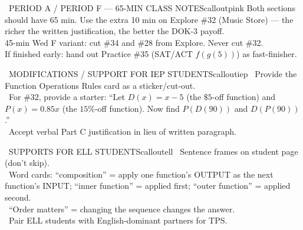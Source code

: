 \documentclass[11pt]{article}
\begin{document}
\clearpage

\begin{callout}{\IconClock\ PERIOD A / PERIOD F --- 65-MIN CLASS NOTES}{calloutpink}
Both sections should have 65 min. Use the extra 10 min on Explore \#32 (Music Store) --- the richer the written justification, the better the DOK-3 payoff.\\
45-min Wed F variant: cut \#34 and \#28 from Explore. Never cut \#32.\\
If finished early: hand out Practice \#35 (SAT/ACT \(f(g(5))\)) as fast-finisher.
\end{callout}

\begin{callout}{\IconPuzzle\ MODIFICATIONS / SUPPORT FOR IEP STUDENTS}{calloutiep}
\textbullet\ Provide the Function Operations Rules card as a sticker/cut-out.\\
\textbullet\ For \#32, provide a starter: ``Let \(D(x) = x - 5\) (the \(\$5\)-off function) and \(P(x) = 0.85x\) (the \(15\%\)-off function). Now find \(P(D(90))\) and \(D(P(90))\).''\\
\textbullet\ Accept verbal Part C justification in lieu of written paragraph.
\end{callout}

\begin{callout}{\IconGlobe\ SUPPORTS FOR ELL STUDENTS}{calloutell}
\textbullet\ Sentence frames on student page (don't skip).\\
\textbullet\ Word cards: ``composition'' = apply one function's OUTPUT as the next function's INPUT; ``inner function'' = applied first; ``outer function'' = applied second.\\
\textbullet\ ``Order matters'' = changing the sequence changes the answer.\\
\textbullet\ Pair ELL students with English-dominant partners for TPS.
\end{callout}
\end{document}
